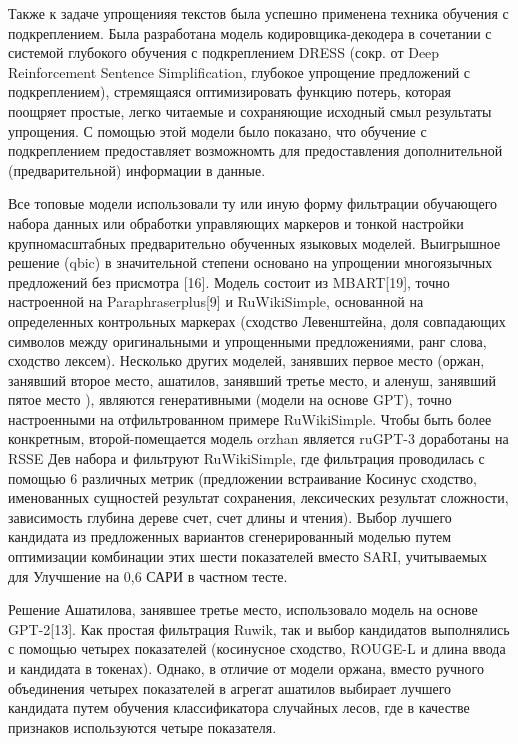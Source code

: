 Также к задаче упрощенияя текстов была успешно применена техника обучения с подкреплением\cite{zhang_sentence_2017}. Была разработана модель кодировщика-декодера в сочетании с системой глубокого обучения с подкреплением DRESS (сокр. от Deep Reinforcement Sentence Simplification, глубокое упрощение предложений с подкреплением), стремящаяся оптимизировать функцию потерь, которая поощряет простые, легко читаемые и сохраняющие исходный смыл результаты упрощения. С помощью этой модели было показано, что обучение с подкреплением предоставляет возможномть для предоставления дополнительной (предварительной) информации в данные. 


Все топовые модели использовали ту или иную форму фильтрации обучающего набора данных или обработки управляющих маркеров и тонкой настройки крупномасштабных предварительно обученных языковых моделей. Выигрышное решение (qbic) в значительной степени основано на упрощении многоязычных предложений без присмотра [16]. Модель состоит из MBART[19], точно настроенной на Paraphraserplus[9] и RuWikiSimple, основанной на определенных контрольных маркерах (сходство Левенштейна, доля совпадающих символов между оригинальными и упрощенными предложениями, ранг слова, сходство лексем). Несколько других моделей, занявших первое место (оржан, занявший второе место, ашатилов, занявший третье место, и аленуш, занявший пятое место ), являются генеративными (модели на основе GPT), точно настроенными на отфильтрованном примере RuWikiSimple. Чтобы быть более конкретным, второй-помещается модель orzhan является ruGPT-3 доработаны на RSSE Дев набора и фильтруют RuWikiSimple, где фильтрация проводилась с помощью 6 различных метрик (предложении встраивание Косинус сходство, именованных сущностей результат сохранения, лексических результат сложности, зависимость глубина дереве счет, счет длины и чтения). Выбор лучшего кандидата из предложенных вариантов сгенерированный моделью путем оптимизации комбинации этих шести показателей вместо SARI, учитываемых для Улучшение на 0,6 САРИ в частном тесте.

Решение Ашатилова, занявшее третье место, использовало модель на основе GPT-2[13]. Как простая фильтрация Ruwik, так и выбор кандидатов выполнялись с помощью четырех показателей (косинусное сходство, ROUGE-L и длина ввода и кандидата в токенах). Однако, в отличие от модели оржана, вместо ручного объединения четырех показателей в агрегат ашатилов выбирает лучшего кандидата путем обучения классификатора случайных лесов, где в качестве признаков используются четыре показателя.

